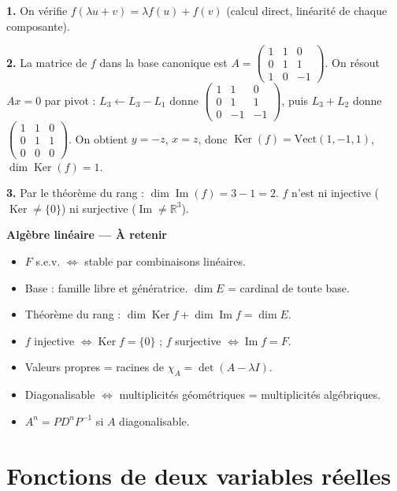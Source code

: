\documentclass[11pt,a4paper,twoside]{book}
\newcommand{\R}{\mathbb{R}}
\DeclareMathOperator{\Im}{Im}
\DeclareMathOperator{\Ker}{Ker}
\begin{document}
\begin{correctionbox}[Correction]
\textbf{1.} On vérifie $f(\lambda u + v) = \lambda f(u) + f(v)$ (calcul direct, linéarité de chaque composante).

\textbf{2.} La matrice de $f$ dans la base canonique est $A = \begin{pmatrix}1&1&0\\0&1&1\\1&0&-1\end{pmatrix}$.
On résout $Ax = 0$ par pivot :
$L_3 \leftarrow L_3 - L_1$ donne $\begin{pmatrix}1&1&0\\0&1&1\\0&-1&-1\end{pmatrix}$,
puis $L_3 + L_2$ donne $\begin{pmatrix}1&1&0\\0&1&1\\0&0&0\end{pmatrix}$.
On obtient $y = -z$, $x = z$, donc $\Ker(f) = \mathrm{Vect}(1,-1,1)$, $\dim \Ker(f) = 1$.

\textbf{3.} Par le théorème du rang : $\dim \Im(f) = 3 - 1 = 2$. $f$ n'est ni injective ($\Ker \neq \{0\}$) ni surjective ($\Im \neq \R^3$).
\end{correctionbox}

\begin{retenirbox}
\textbf{Algèbre linéaire — À retenir}
\begin{itemize}
  \item $F$ s.e.v. $\iff$ stable par combinaisons linéaires.
  \item Base : famille libre et génératrice. $\dim E$ = cardinal de toute base.
  \item Théorème du rang : $\dim \Ker f + \dim \Im f = \dim E$.
  \item $f$ injective $\iff \Ker f = \{0\}$ ; $f$ surjective $\iff \Im f = F$.
  \item Valeurs propres = racines de $\chi_A = \det(A-\lambda I)$.
  \item Diagonalisable $\iff$ multiplicités géométriques = multiplicités algébriques.
  \item $A^n = PD^nP^{-1}$ si $A$ diagonalisable.
\end{itemize}
\end{retenirbox}

\chapter{Fonctions de deux variables réelles}
\end{document}

